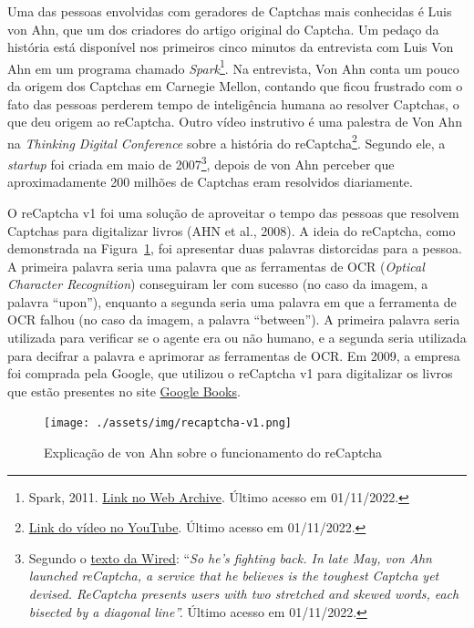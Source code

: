 \documentclass[12pt,twoside,brazilian]{book}
\begin{document}
Uma das pessoas envolvidas com geradores de Captchas mais conhecidas é
Luis von Ahn, que um dos criadores do artigo original do Captcha. Um
pedaço da história está disponível nos primeiros cinco minutos da
entrevista com Luis Von Ahn em um programa chamado
\emph{Spark}\footnote{Spark, 2011.
  \href{https://web.archive.org/web/20120603142110/http://www.cbc.ca/spark/2011/11/full-interview-luis-von-ahn-on-duolingo/}{Link
  no Web Archive}. Último acesso em 01/11/2022.}. Na entrevista, Von Ahn
conta um pouco da origem dos Captchas em Carnegie Mellon, contando que
ficou frustrado com o fato das pessoas perderem tempo de inteligência
humana ao resolver Captchas, o que deu origem ao reCaptcha. Outro vídeo
instrutivo é uma palestra de Von Ahn na \emph{Thinking Digital
Conference} sobre a história do reCaptcha\footnote{\href{https://www.youtube.com/watch?v=i_5ew4btJiQ}{Link
  do vídeo no YouTube}. Último acesso em 01/11/2022.}. Segundo ele, a
\emph{startup} foi criada em maio de 2007\footnote{Segundo o
  \href{https://www.wired.com/2007/06/ff-humancomp/}{texto da Wired}:
  ``\emph{So he's fighting back. In late May, von Ahn launched
  reCaptcha, a service that he believes is the toughest Captcha yet
  devised. ReCaptcha presents users with two stretched and skewed words,
  each bisected by a diagonal line''.} Último acesso em 01/11/2022.},
depois de von Ahn perceber que aproximadamente 200 milhões de Captchas
eram resolvidos diariamente.

O reCaptcha v1 foi uma solução de aproveitar o tempo das pessoas que
resolvem Captchas para digitalizar livros (AHN et al., 2008). A ideia do
reCaptcha, como demonstrada na Figura~\ref{fig-recaptcha-v1}, foi
apresentar duas palavras distorcidas para a pessoa. A primeira palavra
seria uma palavra que as ferramentas de OCR (\emph{Optical Character
Recognition}) conseguiram ler com sucesso (no caso da imagem, a palavra
``upon''), enquanto a segunda seria uma palavra em que a ferramenta de
OCR falhou (no caso da imagem, a palavra ``between''). A primeira
palavra seria utilizada para verificar se o agente era ou não humano, e
a segunda seria utilizada para decifrar a palavra e aprimorar as
ferramentas de OCR. Em 2009, a empresa foi comprada pela Google, que
utilizou o reCaptcha v1 para digitalizar os livros que estão presentes
no site \href{https://books.google.com.br/}{Google Books}.

\begin{figure}

{\centering \texttt{[image: ./assets/img/recaptcha-v1.png]}

}

\caption{\label{fig-recaptcha-v1}Explicação de von Ahn sobre o
funcionamento do reCaptcha}

\end{figure}
\end{document}
